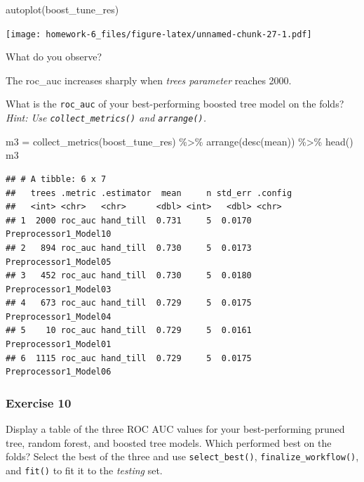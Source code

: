 \documentclass[
]{article}
\newenvironment{Shaded}{\begin{snugshade}}{\end{snugshade}}
\newcommand{\FunctionTok}[1]{\textcolor[rgb]{0.00,0.00,0.00}{#1}}
\newcommand{\NormalTok}[1]{#1}
\newcommand{\OtherTok}[1]{\textcolor[rgb]{0.56,0.35,0.01}{#1}}
\newcommand{\SpecialCharTok}[1]{\textcolor[rgb]{0.00,0.00,0.00}{#1}}
\begin{document}
\begin{Shaded}
\begin{Highlighting}[]
\FunctionTok{autoplot}\NormalTok{(boost\_tune\_res)}
\end{Highlighting}
\end{Shaded}

\texttt{[image: homework-6\_files/figure-latex/unnamed-chunk-27-1.pdf]}

What do you observe?

The roc\_auc increases sharply when \emph{trees parameter} reaches 2000.

What is the \texttt{roc\_auc} of your best-performing boosted tree model
on the folds? \emph{Hint: Use \texttt{collect\_metrics()} and
\texttt{arrange()}.}

\begin{Shaded}
\begin{Highlighting}[]
\NormalTok{m3 }\OtherTok{=} \FunctionTok{collect\_metrics}\NormalTok{(boost\_tune\_res) }\SpecialCharTok{\%\textgreater{}\%} \FunctionTok{arrange}\NormalTok{(}\FunctionTok{desc}\NormalTok{(mean)) }\SpecialCharTok{\%\textgreater{}\%} \FunctionTok{head}\NormalTok{()}
\NormalTok{m3}
\end{Highlighting}
\end{Shaded}

\begin{verbatim}
## # A tibble: 6 x 7
##   trees .metric .estimator  mean     n std_err .config              
##   <int> <chr>   <chr>      <dbl> <int>   <dbl> <chr>                
## 1  2000 roc_auc hand_till  0.731     5  0.0170 Preprocessor1_Model10
## 2   894 roc_auc hand_till  0.730     5  0.0173 Preprocessor1_Model05
## 3   452 roc_auc hand_till  0.730     5  0.0180 Preprocessor1_Model03
## 4   673 roc_auc hand_till  0.729     5  0.0175 Preprocessor1_Model04
## 5    10 roc_auc hand_till  0.729     5  0.0161 Preprocessor1_Model01
## 6  1115 roc_auc hand_till  0.729     5  0.0175 Preprocessor1_Model06
\end{verbatim}

\hypertarget{exercise-10}{%
\subsubsection{Exercise 10}\label{exercise-10}}

Display a table of the three ROC AUC values for your best-performing
pruned tree, random forest, and boosted tree models. Which performed
best on the folds? Select the best of the three and use
\texttt{select\_best()}, \texttt{finalize\_workflow()}, and
\texttt{fit()} to fit it to the \emph{testing} set.
\end{document}
